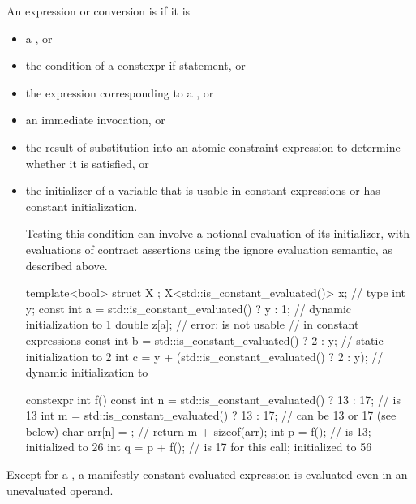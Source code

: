 \pnum
An expression or conversion is 
if it is
\begin{itemize}
\item a , or
\item the condition of a constexpr if statement, or
\item the expression corresponding to
a , or
\item an immediate invocation, or
\item the result of substitution into an atomic constraint expression
to determine whether it is satisfied, or
\item the initializer of a variable
that is usable in constant expressions or
has constant initialization.
\begin{footnote}
Testing this condition
can involve a notional evaluation of its initializer,
with evaluations of contract assertions
using the ignore evaluation semantic,
as described above.
\end{footnote}
\begin{example}
\begin{codeblock}
template<bool> struct X {};
X<std::is_constant_evaluated()> x;                      // type 
int y;
const int a = std::is_constant_evaluated() ? y : 1;     // dynamic initialization to 1
double z[a];                                            // error:  is not usable
                                                        // in constant expressions
const int b = std::is_constant_evaluated() ? 2 : y;     // static initialization to 2
int c = y + (std::is_constant_evaluated() ? 2 : y);     // dynamic initialization to 

constexpr int f() {
  const int n = std::is_constant_evaluated() ? 13 : 17; //  is 13
  int m = std::is_constant_evaluated() ? 13 : 17;       //  can be 13 or 17 (see below)
  char arr[n] = {};                                     // 
  return m + sizeof(arr);
}
int p = f();                                            //  is 13; initialized to 26
int q = p + f();                                        //  is 17 for this call; initialized to 56
\end{codeblock}
\end{example}
\end{itemize}
\begin{note}
Except for a ,
a manifestly constant-evaluated expression
is evaluated even in an unevaluated operand.
\end{note}

